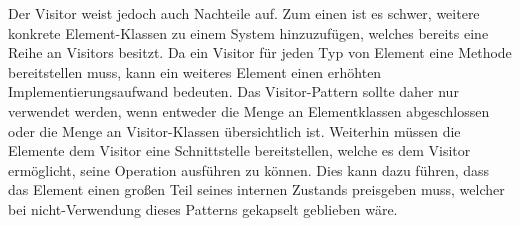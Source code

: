 Der Visitor weist jedoch auch Nachteile auf. Zum einen ist es schwer, weitere konkrete Element-Klassen zu einem System hinzuzufügen, welches bereits eine Reihe an Visitors besitzt. Da ein Visitor für jeden Typ von Element eine Methode bereitstellen muss, kann ein weiteres Element einen erhöhten Implementierungsaufwand bedeuten. Das Visitor-Pattern sollte daher nur verwendet werden, wenn entweder die Menge an Elementklassen abgeschlossen oder die Menge an Visitor-Klassen übersichtlich ist. Weiterhin müssen die Elemente dem Visitor eine Schnittstelle bereitstellen, welche es dem Visitor ermöglicht, seine Operation ausführen zu können. Dies kann dazu führen, dass das Element einen großen Teil seines internen Zustands preisgeben muss, welcher bei nicht-Verwendung dieses Patterns gekapselt geblieben wäre. \cite{gamma_design_1995}